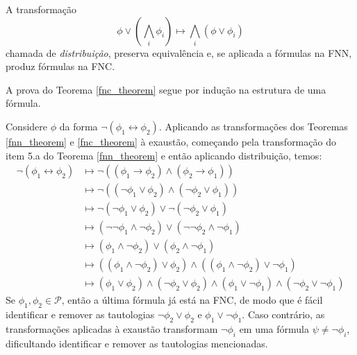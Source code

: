\begin{theorem}
	\label{fnc_theorem}
    A transformação $$\phi \vee \left( \bigwedge_i \phi_i \right) \longmapsto \bigwedge_i \left( \phi \vee \phi_i \right)$$ chamada de \emph{distribuição}, preserva equivalência e, se aplicada a fórmulas na FNN, produz fórmulas na FNC.
\end{theorem}

A prova do Teorema \ref{fnc_theorem} segue por indução na estrutura de uma fórmula.

\begin{example}
    Considere $\phi$ da forma $\neg(\phi_1 \leftrightarrow \phi_2)$. Aplicando as transformações dos Teoremas \ref{fnn_theorem} e \ref{fnc_theorem} à exaustão, começando pela transformação do item 5.a do Teorema \ref{fnn_theorem} e então aplicando distribuição, temos:
    \begin{equation*}
        \begin{split}
            \neg(\phi_1 \leftrightarrow \phi_2) & \longmapsto \neg((\phi_1 \rightarrow \phi_2) \wedge (\phi_2 \rightarrow \phi_1)) \\
                 & \longmapsto \neg((\neg \phi_1 \vee \phi_2) \wedge (\neg \phi_2 \vee \phi_1)) \\
                 & \longmapsto \neg(\neg \phi_1 \vee \phi_2) \vee \neg(\neg \phi_2 \vee \phi_1) \\
                 & \longmapsto (\neg \neg \phi_1 \wedge \neg \phi_2) \vee (\neg \neg \phi_2 \wedge \neg \phi_1) \\
                 & \longmapsto (\phi_1 \wedge \neg \phi_2) \vee (\phi_2 \wedge \neg \phi_1) \\
                 & \longmapsto ((\phi_1 \wedge \neg \phi_2) \vee \phi_2) \wedge ((\phi_1 \wedge \neg \phi_2) \vee \neg \phi_1) \\
                 & \longmapsto (\phi_1 \vee \phi_2) \wedge (\neg \phi_2 \vee \phi_2) \wedge (\phi_1 \vee \neg \phi_1) \wedge (\neg \phi_2 \vee \neg \phi_1)
        \end{split}
    \end{equation*}
    Se $\phi_1,\phi_2 \in \mathcal{P}$, então a última fórmula já está na FNC, de modo que é fácil identificar e remover as tautologias $\neg \phi_2 \vee \phi_2$ e $\phi_1 \vee \neg \phi_1$. Caso contrário, as transformações aplicadas à exaustão transformam $\neg \phi_i$ em uma fórmula $\psi \neq \neg \phi_i$, dificultando identificar e remover as tautologias mencionadas.
    

\end{example}
